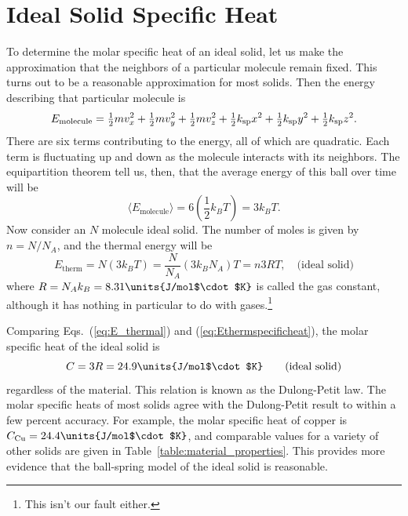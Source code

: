\section{Ideal Solid Specific Heat}

To determine the molar specific heat of an ideal solid,
let us make the approximation that the neighbors of
a particular molecule remain fixed.  This turns out to be a reasonable
approximation for most solids.  Then the energy describing that
particular molecule is
\begin{equation}
E_\text{molecule} = {\textstyle\frac{1}{2}}mv_x^2 +
{\textstyle\frac{1}{2}}mv_y^2 + {\textstyle\frac{1}{2}}mv_z^2 +
{\textstyle\frac{1}{2}}k_\text{sp}x^2 + {\textstyle\frac{1}{2}}k_{\rm sp}y^2 +
{\textstyle\frac{1}{2}}k_\text{sp}z^2.
\label{eq:ball-spring_energy}
\end{equation}
There are six terms contributing to the energy, all of which are
quadratic.  Each term is fluctuating up and down as the molecule
interacts with its neighbors.  The equipartition theorem tell us,
then, that the average energy of this ball over time will be
\begin{equation}
\langle E_\text{molecule}\rangle =
6\left({\textstyle\frac{1}{2}}k_BT\right) = 3k_BT.
\end{equation}
Now consider an $N$ molecule ideal solid.  The number of moles
is given by $n = N/N_A$, and the 
thermal energy will be
\begin{equation}
E_\text{therm} = N (3 k_B T) = \frac{N}{N_A}(3k_BN_A)T = n3RT,
\quad\text{(ideal solid)}
\label{eq:E_thermal}
\end{equation}
where $R=N_A k_B = 8.31\units{J/mol$\cdot$K}$ is called the gas
constant, although it has nothing in particular to do with
gases.\footnote{This isn't our fault either.}  

Comparing Eqs.~(\ref{eq:E_thermal}) and (\ref{eq:Ethermspecificheat}),
the molar specific heat of the ideal solid is
\begin{equation}
C = 3R = 24.9\units{J/mol$\cdot$K} \qquad\text{(ideal solid)}
\end{equation}
regardless of the material.  This relation is known as the
Dulong-Petit law.  The molar specific heats of most solids agree with
the Dulong-Petit result to within a few percent accuracy.  For
example, the molar specific heat of copper is $C_\text{Cu} =
24.4\units{J/mol$\cdot$K}$, and comparable values for a variety of
other solids are given in Table~\ref{table:material_properties}.  This
provides more evidence that the ball-spring model of the ideal solid
is reasonable.


